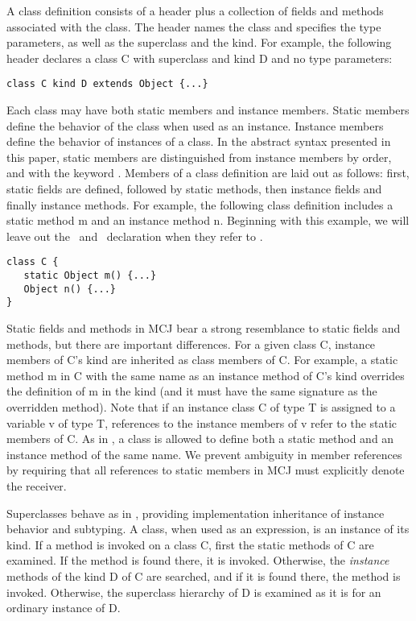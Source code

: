 \documentclass[nocopyrightspace,10pt]{acm-sigplan}
\begin{document}
A class definition consists of a header plus a collection of fields
and methods associated with the class.  The header names the class and
specifies the type parameters, as well as the superclass and the kind.
For example, the following header declares a class {\txt C} with
superclass {} and kind {\txt D} and no type parameters:

\begin{verbatim}
class C kind D extends Object {...}
\end{verbatim}

Each class may have both static members and instance members. Static
members define the behavior of the class when used as an instance.
Instance members define the behavior of instances of a class.  In the
abstract syntax presented in this paper, static members are
distinguished from instance members by order, and with the keyword
\static.  Members of a class definition are laid out as follows:
first, static fields are defined, followed by static methods, then
instance fields and finally instance methods.  For example, the
following class definition includes a static method {\txt m} and an
instance method {\txt n}.  Beginning with this example, we will leave
out the \kind\ and \extends\ declaration when they refer to \Object.

\begin{verbatim}
class C {
   static Object m() {...}
   Object n() {...}
}
\end{verbatim}

Static fields and methods in MCJ bear a strong resemblance to static
fields and methods, but there are important differences. For a given
class {\txt C}, instance members of {\txt C}'s kind are inherited as
class members of {\txt C}. For example, a static method {\txt m} in
{\txt C} with the same name as an instance method of {\txt C}'s kind
overrides the definition of {\txt m} in the kind (and it must have the
same signature as the overridden method). Note that if an instance
class {\txt C} of type {\txt T} is assigned to a variable {\txt v} of
type {\txt T}, references to the instance members of {\txt v} refer to
the static members of {\txt C}.  As in \cite{DimUnits}, a class is
allowed to define both a static method and an instance method of the
same name. We prevent ambiguity in member references by requiring that
all references to static members in MCJ must explicitly denote the
receiver.

Superclasses behave as in \FGJ, providing implementation inheritance
of instance behavior and subtyping. A class, when used as an
expression, is an instance of its kind.  If a method is invoked on a
class {\txt C}, first the static methods of {\txt C} are examined.  If
the method is found there, it is invoked. Otherwise, the
\emph{instance} methods of the kind {\txt D} of {\txt C} are searched,
and if it is found there, the method is invoked.  Otherwise, the
superclass hierarchy of {\txt D} is examined as it is for an ordinary
instance of {\txt D}.
\end{document}

